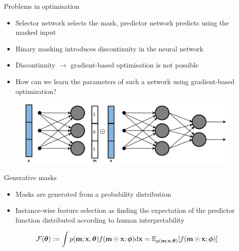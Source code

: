 \documentclass[11pt,compress,t,notes=noshow, aspectratio=169, xcolor=table]{beamer}
\begin{document}
	
\begin{frame}{Problems in optimisation}
    \begin{itemize}
        \item Selector network selects the mask, predictor network predicts using the masked input
        \item Binary masking introduces discontinuity in the neural network
\item Discontinuity $\rightarrow$ gradient-based optimisation is not possible
\bigskip
\item How can we learn the parameters of such a network using gradient-based optimization?
    \end{itemize}
    \begin{figure}
        \centering
        \includegraphics[scale=.43]{bild16}
    \end{figure}
\end{frame}	

\begin{frame}{Generative masks}
    \begin{itemize}
        \item Masks are generated from a probability distribution
        \item Instance-wise feature selection as finding the expectation of the predictor function
distributed according to human interpretability
    \end{itemize}
    \bigskip
   \begin{equation*}
             \centering
    \mathcal{F}(\boldsymbol{\theta}):=\int p(\mathbf{m} ; \mathbf{x}, \boldsymbol{\theta}) f(\mathbf{m} \odot \mathbf{x} ; \boldsymbol{\phi}) \mathrm{d} \mathbf{x}=\mathbb{E}_{p(\mathbf{m} ; \mathbf{x}, \boldsymbol{\theta})}[f(\mathbf{m} \odot \mathbf{x} ; \boldsymbol{\phi})]
\end{equation*}
    
    
    
\end{frame}
	
\end{document}
